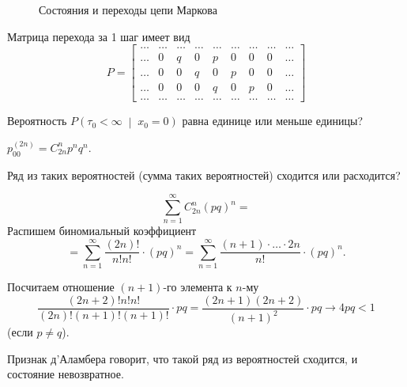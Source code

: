 \begin{figure}[h]
  \centering
  
  \caption{Состояния и переходы цепи Маркова}
  \label{fig:164}
\end{figure}

Матрица перехода за 1 шаг имеет вид
\begin{equation*}
  P =
  \begin{bmatrix}
    \dotsc & \dotsc & \dotsc & \dotsc & \dotsc & \dotsc & \dotsc & \dotsc & \dotsc \\
    \dotsc & 0      & q      & 0      & p      & 0      & 0      & 0      & \dotsc \\
    \dotsc & 0      & 0      & q      & 0      & p      & 0      & 0      & \dotsc \\
    \dotsc & 0      & 0      & 0      & q      & 0      & p      & 0      & \dotsc \\
    \dotsc & \dotsc & \dotsc & \dotsc & \dotsc & \dotsc & \dotsc & \dotsc & \dotsc
  \end{bmatrix}
\end{equation*}

Вероятность $P \left( \tau_0 < \infty \; \middle| \; x_0 = 0 \right) $
равна единице или меньше единицы?

$p_{00}^{ \left( 2n \right) } = C_{2n}^n p^n q^n$.

Ряд из таких вероятностей (сумма таких вероятностей) сходится или расходится?

\begin{equation*}
  \sum \limits_{n = 1}^{ \infty } C_{2n}^n \left( pq \right)^n =
\end{equation*}
Распишем биномиальный коэффициент
\begin{equation*}
  = \sum \limits_{n = 1}^{ \infty }
    \frac{ \left( 2n \right)!}{n! n!} \cdot \left( pq \right)^n =
  \sum \limits_{n = 1}^{ \infty }
    \frac{ \left( n + 1 \right) \cdot \dotsc \cdot 2n}{n!} \cdot
    \left( pq \right)^n.
\end{equation*}

Посчитаем отношение $ \left( n + 1 \right) $-го элемента к $n$-му
\begin{equation*}
  \frac{ \left( 2n + 2 \right)! n! n!}{ \left( 2n \right)! \left( n + 1 \right)! \left( n + 1 \right)!} \cdot
  pq =
  \frac{ \left( 2n + 1 \right) \left( 2n + 2 \right) }{ \left( n + 1 \right)^2} \cdot
  pq \to
  4pq <
  1
\end{equation*}
(если $p \neq q$).

Признак д'Аламбера говорит, что такой ряд из вероятностей сходится,
и состояние невозвратное.

